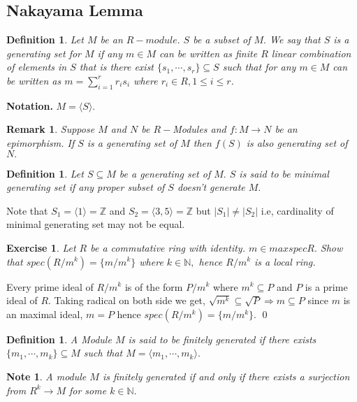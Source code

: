 \documentclass[11pt]{amsart}
\newtheorem{definition}[theorem]{Definition}%
\newtheorem{defn}[theorem]{Definition}
\newtheorem{exercise}[theorem]{Exercise}
\newtheorem{note}[theorem]{Note}
\newtheorem{remark}[theorem]{Remark}%
\newcommand{\ZZ}{\mathbb Z}
\newcommand{\NN}{\mathbb N}
\newcommand{\gen}[1]{\langle#1\rangle}
\begin{document}
\subsection{Nakayama Lemma}

\begin{definition}
Let $M$ be an $R-module.$ $S$ be a subset of $M.$ We say that $S$ is a generating set for $M$ if any $m\in M$ can be written as finite $R$ linear combination of elements in $S$ that is there exist $\{s_{1},\cdots ,s_{r}\}\subseteq S$ such that for any $m\in M$ can be written as $m=\displaystyle\sum_{i=1}^r r_{i}s_{i}$ where $r_{i} \in R,1\leq i\leq r$.
\end{definition}

\textbf{Notation.} $M=\gen{S}.$

\begin{remark}
Suppose $M$ and $N$ be $R-$Modules and $f:M\to N$ be an epimorphism. If $S$ is a generating set of $M$ then $f(S)$ is also generating set of $N.$
\end{remark}

\begin{definition}
Let $S\subseteq M$ be a generating set of $M.$ $S$ is said to be minimal generating set if any proper subset of $S$ doesn't generate $M.$
\end{definition}
Note that $S_{1}=\langle 1\rangle ={\ZZ}$ and $S_{2}=\langle 3,5\rangle ={\ZZ}$ but $|S_{1}|\neq |S_{2}|$ i.e, cardinality of minimal generating set may not be equal.
\begin{exercise}
Let $R$ be a commutative ring with identity. $m\in maxspecR.$ Show that $spec(R/m^k)=\{m/m^k\}$ where $k\in {\NN},$ hence $R/m^k$ is a local ring.
\end{exercise}
\proof Every prime ideal of $R/m^k$ is of the form $P/m^k$ where $m^k\subseteq P$ and $P$ is a prime ideal of $R.$ Taking radical on both side we get, $\sqrt{m^k}\subseteq \sqrt{P} \Rightarrow m\subseteq P$ since $m$ is an maximal ideal, $m=P$ hence $spec(R/m^k)=\{m/m^k\}.$ \qed

\begin{defn}
A Module $M$ is said to be finitely generated if there exists $\{m_1,\cdots,m_k\} \subseteq M$ such that $M=\gen{m_1,\cdots,m_k}.$
\end{defn}

\begin{note}
A module $M$ is finitely generated if and only if there exists a surjection from $R^k\to M$ for some $k\in{\NN}.$
\end{note}
\end{document}
